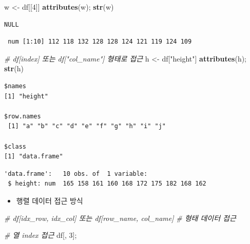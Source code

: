 \documentclass[
  11pt,
]{krantz}
\newenvironment{Shaded}{\begin{snugshade}}{\end{snugshade}}
\newcommand{\CommentTok}[1]{\textcolor[rgb]{0.37,0.37,0.37}{\textit{#1}}}
\newcommand{\DecValTok}[1]{\textcolor[rgb]{0.06,0.06,0.06}{#1}}
\newcommand{\KeywordTok}[1]{\textcolor[rgb]{0.27,0.27,0.27}{\textbf{#1}}}
\newcommand{\NormalTok}[1]{#1}
\newcommand{\StringTok}[1]{\textcolor[rgb]{0.5,0.5,0.5}{#1}}
\providecommand{\tightlist}{%
  \setlength{\itemsep}{0pt}\setlength{\parskip}{0pt}}
\begin{document}
\begin{Shaded}
\begin{Highlighting}[]
\NormalTok{w <-}\StringTok{ }\NormalTok{df[[}\DecValTok{4}\NormalTok{]]}
\KeywordTok{attributes}\NormalTok{(w); }\KeywordTok{str}\NormalTok{(w)}
\end{Highlighting}
\end{Shaded}

\begin{verbatim}
NULL
\end{verbatim}

\begin{verbatim}
 num [1:10] 112 118 132 128 128 124 121 119 124 109
\end{verbatim}

\begin{Shaded}
\begin{Highlighting}[]
\CommentTok{# df[index] 또는 df["col_name"] 형태로 접근}
\NormalTok{h <-}\StringTok{ }\NormalTok{df[}\StringTok{"height"}\NormalTok{]}
\KeywordTok{attributes}\NormalTok{(h); }\KeywordTok{str}\NormalTok{(h)}
\end{Highlighting}
\end{Shaded}

\begin{verbatim}
$names
[1] "height"

$row.names
 [1] "a" "b" "c" "d" "e" "f" "g" "h" "i" "j"

$class
[1] "data.frame"
\end{verbatim}

\begin{verbatim}
'data.frame':   10 obs. of  1 variable:
 $ height: num  165 158 161 160 168 172 175 182 168 162
\end{verbatim}

\normalsize

\begin{itemize}
\tightlist
\item
  행렬 데이터 접근 방식
\end{itemize}

\footnotesize

\begin{Shaded}
\begin{Highlighting}[]
\CommentTok{# df[idx_row, idx_col] 또는 df[row_name, col_name] }
\CommentTok{# 형태 데이터 접근}

\CommentTok{# 열 index 접근}
\NormalTok{df[, }\DecValTok{3}\NormalTok{];}
\end{Highlighting}
\end{Shaded}
\end{document}
